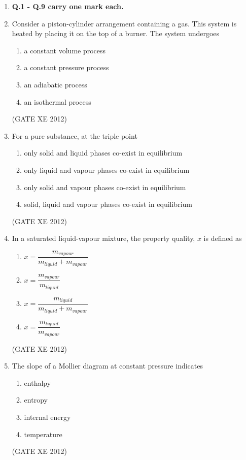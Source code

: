 \documentclass[12pt]{article}
\begin{document}
\begin{enumerate}

\item[] \textbf{Q.1 - Q.9 carry one mark each.}


\item Consider a piston-cylinder arrangement containing a gas. This system is heated by placing it on the top of a burner. The system undergoes  
\begin{enumerate}
    \item a constant volume process  
    \item a constant pressure process  
    \item an adiabatic process  
    \item an isothermal process  
\end{enumerate}
(GATE XE 2012)

\item For a pure substance, at the triple point  
\begin{enumerate}
    \item only solid and liquid phases co-exist in equilibrium  
    \item only liquid and vapour phases co-exist in equilibrium  
    \item only solid and vapour phases co-exist in equilibrium  
    \item solid, liquid and vapour phases co-exist in equilibrium  
\end{enumerate}
(GATE XE 2012)

\item In a saturated liquid-vapour mixture, the property quality, $x$ is defined as  
\begin{multicols}{2}
\begin{enumerate}
    \item $x = \dfrac{m_{vapour}}{m_{liquid} + m_{vapour}}$  
    \item $x = \dfrac{m_{vapour}}{m_{liquid}}$  
    \item $x = \dfrac{m_{liquid}}{m_{liquid} + m_{vapour}}$  
    \item $x = \dfrac{m_{liquid}}{m_{vapour}}$  
\end{enumerate}
\end{multicols}
(GATE XE 2012)

\item The slope of a Mollier diagram at constant pressure indicates  
\begin{multicols}{2}
\begin{enumerate}
    \item enthalpy  
    \item entropy  
    \item internal energy  
    \item temperature  
\end{enumerate}
\end{multicols}
(GATE XE 2012)


\end{enumerate}
\end{document}
